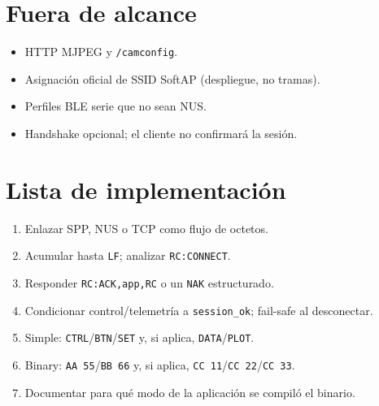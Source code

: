 \documentclass[12pt,a4paper]{article}
\begin{document}
\section{Fuera de alcance}

\begin{itemize}[leftmargin=1.2cm]
  \item HTTP MJPEG y \texttt{/camconfig}.
  \item Asignación oficial de SSID SoftAP (despliegue, no tramas).
  \item Perfiles BLE serie que no sean NUS.
  \item Handshake opcional; el cliente no confirmará la sesión.
\end{itemize}

\section{Lista de implementación}

\begin{enumerate}[leftmargin=1.6cm]
  \item Enlazar SPP, NUS o TCP como flujo de octetos.
  \item Acumular hasta \texttt{LF}; analizar \texttt{RC:CONNECT}.
  \item Responder \texttt{RC:ACK,app,RC} o un \texttt{NAK} estructurado.
  \item Condicionar control/telemetría a \texttt{session\_ok}; fail-safe
        al desconectar.
  \item Simple: \texttt{CTRL}/\texttt{BTN}/\texttt{SET} y, si aplica,
        \texttt{DATA}/\texttt{PLOT}.
  \item Binary: \texttt{AA 55}/\texttt{BB 66} y, si aplica,
        \texttt{CC 11}/\texttt{CC 22}/\texttt{CC 33}.
  \item Documentar para qué modo de la aplicación se compiló el binario.
\end{enumerate}
\end{document}
